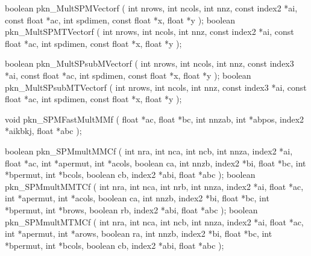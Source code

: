 \begin{listingC}
boolean pkn_MultSPMVectorf ( int nrows, int ncols, int nnz,
                             const index2 *ai, const float *ac,    
                             int spdimen, const float *x,
                             float *y );
boolean pkn_MultSPMTVectorf ( int nrows, int ncols, int nnz,
                              const index2 *ai, const float *ac,
                              int spdimen, const float *x,
                              float *y );

boolean pkn_MultSPsubMVectorf ( int nrows, int ncols, int nnz,
                                const index3 *ai, const float *ac,
                                int spdimen, const float *x, 
                                float *y );
boolean pkn_MultSPsubMTVectorf ( int nrows, int ncols, int nnz,
                                 const index3 *ai, const float *ac,
                                 int spdimen, const float *x,
                                 float *y );
\end{listingC}

\begin{listingC}
void pkn_SPMFastMultMMf ( float *ac, float *bc,
                          int nnzab, int *abpos, index2 *aikbkj,
                          float *abc );
\end{listingC}

\begin{listingC}
boolean pkn_SPMmultMMCf ( int nra, int nca, int ncb,
                          int nnza, index2 *ai, float *ac,
                          int *apermut, int *acols, boolean ca,
                          int nnzb, index2 *bi, float *bc,
                          int *bpermut, int *bcols, boolean cb,
                          index2 *abi, float *abc );
boolean pkn_SPMmultMMTCf ( int nra, int nca, int nrb,
                           int nnza, index2 *ai, float *ac,
                           int *apermut, int *acols, boolean ca,
                           int nnzb, index2 *bi, float *bc,
                           int *bpermut, int *brows, boolean rb,
                           index2 *abi, float *abc );
boolean pkn_SPMmultMTMCf ( int nra, int nca, int ncb,
                           int nnza, index2 *ai, float *ac,
                           int *apermut, int *arows, boolean ra,
                           int nnzb, index2 *bi, float *bc,
                           int *bpermut, int *bcols, boolean cb,
                           index2 *abi, float *abc );
\end{listingC}

